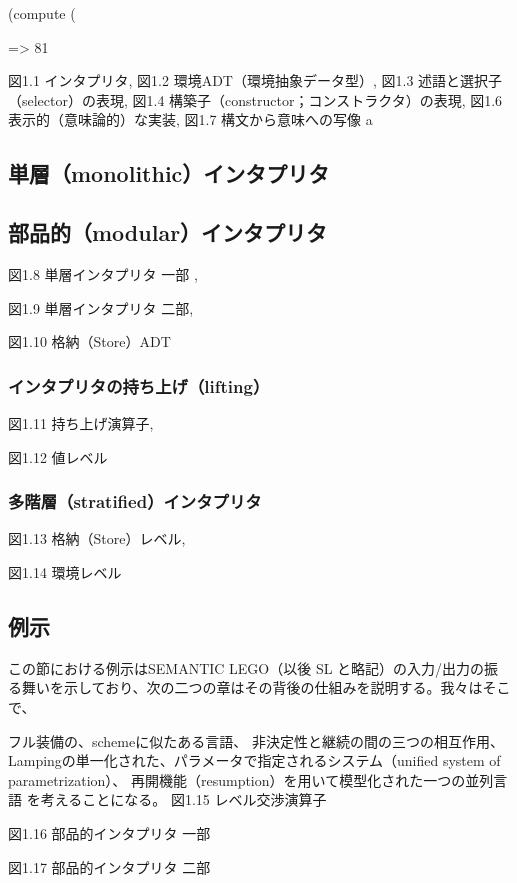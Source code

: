 \documentclass[11pt, oneside]{jsarticle}   	%
\begin{document}
(compute (%

=> 81



図1.1 インタプリタ,
図1.2 環境ADT（環境抽象データ型）,
図1.3 述語と選択子（selector）の表現,
図1.4 構築子（constructor；コンストラクタ）の表現,
図1.6 表示的（意味論的）な実装,
図1.7 構文から意味への写像
a

\subsection{単層（monolithic）インタプリタ}
\subsection{部品的（modular）インタプリタ}
図1.8 単層インタプリタ 一部 ,

図1.9 単層インタプリタ 二部,

図1.10 格納（Store）ADT


\subsubsection{インタプリタの持ち上げ（lifting）}
図1.11 持ち上げ演算子,

図1.12 値レベル

\subsubsection{多階層（stratified）インタプリタ}
図1.13 格納（Store）レベル,

図1.14 環境レベル


\subsection{例示}
この節における例示はSEMANTIC LEGO（以後 SL と略記）の入力/出力の振る舞いを示しており、次の二つの章はその背後の仕組みを説明する。我々はそこで、

フル装備の、schemeに似たある言語、
非決定性と継続の間の三つの相互作用、
Lampingの単一化された、パラメータで指定されるシステム（unified system of parametrization）、
再開機能（resumption）を用いて模型化された一つの並列言語
を考えることになる。
図1.15 レベル交渉演算子

図1.16 部品的インタプリタ 一部

図1.17 部品的インタプリタ 二部
\end{document}
